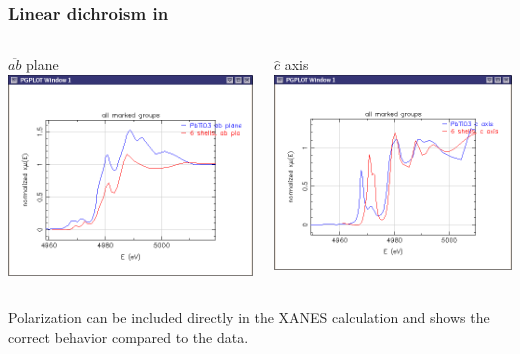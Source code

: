 \begin{frame}
  \frametitle{Linear dichroism in \pto}
  \begin{columns}
    \begin{column}{0.48\linewidth}
      \begin{block}{$\overline{ab}$ plane}
        \centering\includegraphics[width=0.85\linewidth]{images/PbTiO3/ab}
      \end{block}
    \end{column}
    \begin{column}{0.48\linewidth}
      \begin{block}{$\hat{c}$ axis}
        \centering\includegraphics[width=0.85\linewidth]{images/PbTiO3/c}
      \end{block}
    \end{column}
  \end{columns}

  \bigskip

  \begin{center}
    Polarization can be included directly in the XANES calculation and
    shows the correct behavior compared to the data.
  \end{center}
\end{frame}

